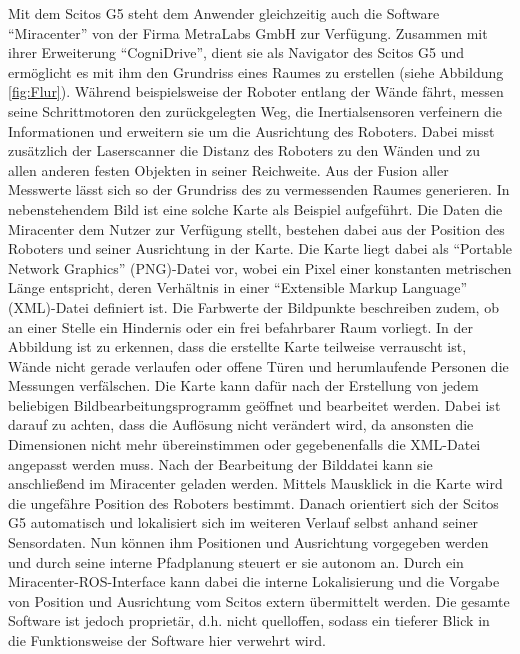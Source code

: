 Mit dem Scitos G5 steht dem Anwender gleichzeitig auch die Software "`Miracenter"' von der Firma MetraLabs GmbH zur Verfügung. Zusammen mit ihrer Erweiterung "`CogniDrive"', dient sie als Navigator des Scitos G5 und ermöglicht es mit ihm den Grundriss eines Raumes zu erstellen (siehe Abbildung \ref{fig:Flur}). Während beispielsweise der Roboter entlang der Wände fährt, messen seine Schrittmotoren den zurückgelegten Weg, die Inertialsensoren verfeinern die Informationen und erweitern sie um die Ausrichtung des Roboters. Dabei misst zusätzlich der Laserscanner die Distanz des Roboters zu den Wänden und zu allen anderen festen Objekten in seiner Reichweite. Aus der Fusion aller Messwerte lässt sich so der Grundriss des zu vermessenden Raumes generieren. In nebenstehendem Bild ist eine solche Karte als Beispiel aufgeführt. Die Daten die Miracenter dem Nutzer zur Verfügung stellt, bestehen dabei aus der Position des Roboters und seiner Ausrichtung in der Karte. Die Karte liegt dabei als "`Portable Network Graphics"' (PNG)-Datei vor, wobei ein Pixel einer konstanten metrischen Länge entspricht, deren Verhältnis in einer "`Extensible Markup Language"' (XML)-Datei definiert ist. Die Farbwerte der Bildpunkte beschreiben zudem, ob an einer Stelle ein Hindernis oder ein frei befahrbarer Raum vorliegt. In der Abbildung ist zu erkennen, dass die erstellte Karte teilweise verrauscht ist, Wände nicht gerade verlaufen oder offene Türen und herumlaufende Personen die Messungen verfälschen. Die Karte kann dafür nach der Erstellung von jedem beliebigen Bildbearbeitungsprogramm geöffnet und bearbeitet werden. Dabei ist darauf zu achten, dass die Auflösung nicht verändert wird, da ansonsten die Dimensionen nicht mehr übereinstimmen oder gegebenenfalls die XML-Datei angepasst werden muss. Nach der Bearbeitung der Bilddatei kann sie anschließend im Miracenter geladen werden. Mittels Mausklick in die Karte wird die ungefähre Position des Roboters bestimmt. Danach orientiert sich der Scitos G5 automatisch und lokalisiert sich im weiteren Verlauf selbst anhand seiner Sensordaten. Nun können ihm Positionen und Ausrichtung vorgegeben werden und durch seine interne Pfadplanung steuert er sie autonom an. Durch ein Miracenter-ROS-Interface kann dabei die interne Lokalisierung und die Vorgabe von Position und Ausrichtung vom Scitos extern übermittelt werden. Die gesamte Software ist jedoch proprietär, d.h. nicht quelloffen, sodass ein tieferer Blick in die Funktionsweise der Software hier verwehrt wird.
